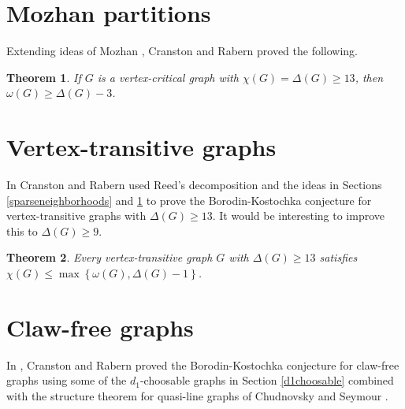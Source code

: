 \documentclass[12pt]{article}
\theoremstyle{plain}
\newtheorem{thm}{Theorem}
\theoremstyle{definition}
\theoremstyle{remark}
\newcommand{\set}[1]{\left\{ #1 \right\}}
\begin{document}
\section{Mozhan partitions}\label{shuffle}
Extending ideas of Mozhan \cite{mozhan1983}, Cranston and Rabern \cite{bigcliques} proved the following.
\begin{thm}
If $G$ is a vertex-critical graph with $\chi(G) = \Delta(G) \ge 13$, then $\omega(G) \ge \Delta(G) - 3$.
\end{thm}

\section{Vertex-transitive graphs}
In \cite{vertextransitive} Cranston and Rabern used Reed's decomposition and the ideas in Sections \ref{sparseneighborhoods} and \ref{shuffle} to prove 
the Borodin-Kostochka conjecture for vertex-transitive graphs with $\Delta(G) \ge 13$.  It would be interesting to improve this to $\Delta(G) \ge 9$.

\begin{thm}
Every vertex-transitive graph $G$ with $\Delta(G) \ge 13$ satisfies $\chi(G) \le \max\set{\omega(G), \Delta(G) - 1}$.
\end{thm}

\section{Claw-free graphs}
In \cite{cranstonrabernclaw}, Cranston and Rabern proved the Borodin-Kostochka conjecture for claw-free graphs using some of the $d_1$-choosable graphs in Section \ref{d1choosable} 
combined with the structure theorem for quasi-line graphs of Chudnovsky and Seymour \cite{chudnovsky2005structure}.


\end{document}
